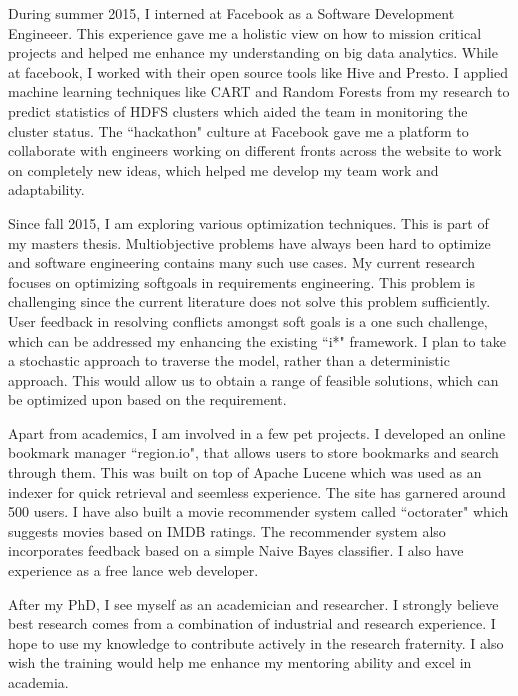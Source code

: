 \documentclass{article}
\begin{document}
\bigskip
During summer 2015, I interned at Facebook as a Software Development Engineeer. This experience gave me a holistic view on how to mission critical projects and helped me enhance my understanding on big data analytics. While at facebook, I worked with their open source tools like Hive and Presto. I applied machine learning techniques like CART and Random Forests from my research to predict statistics of HDFS clusters which aided the team in monitoring the cluster status. The ``hackathon" culture at Facebook gave me a platform to collaborate with engineers working on different fronts across the website to work on completely new ideas, which helped me develop my team work and adaptability. 

\bigskip
Since fall 2015, I am exploring various optimization techniques. This is part of my masters thesis. Multiobjective problems have always been hard to optimize and software engineering contains many such use cases. My current research focuses on optimizing softgoals in requirements engineering. This problem is challenging since the current literature does not solve this problem sufficiently. User feedback in resolving conflicts amongst soft goals is a one such challenge, which can be addressed my enhancing the existing ``i*" framework. I plan to take a stochastic approach to traverse the model, rather than a deterministic approach. This would allow us to obtain a range of feasible solutions, which can be optimized upon based on the requirement.

\bigskip
Apart from academics, I am involved in a few pet projects. I developed an online bookmark manager ``region.io", that allows users to store bookmarks and search through them. This was built on top of Apache Lucene which was used as an indexer for quick retrieval and seemless experience. The site has garnered around 500 users. I have also built a movie recommender system called ``octorater" which suggests movies based on IMDB ratings. The recommender system also incorporates feedback based on a simple Naive Bayes classifier. I also have experience as a free lance web developer.

\bigskip
After my PhD, I see myself as an academician and researcher. I strongly believe best research comes from a combination of industrial and research experience. I hope to use my knowledge to contribute actively in the research fraternity. I also wish the training would help me enhance my mentoring ability and excel in academia.
\end{document}
